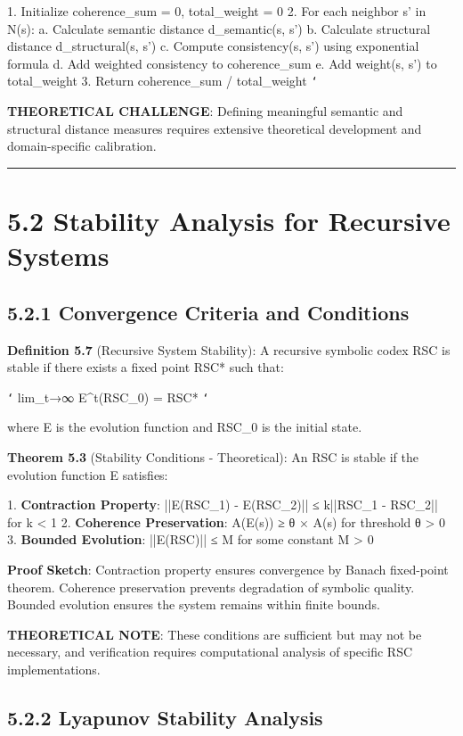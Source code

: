 1. Initialize coherence_sum = 0, total_weight = 0
2. For each neighbor s' in N(s):
   a. Calculate semantic distance d_semantic(s, s')
   b. Calculate structural distance d_structural(s, s')
   c. Compute consistency(s, s') using exponential formula
   d. Add weighted consistency to coherence_sum
   e. Add weight(s, s') to total_weight
3. Return coherence_sum / total_weight
\texttt{`}

\textbf{THEORETICAL CHALLENGE}: Defining meaningful semantic and structural distance measures requires extensive theoretical development and domain-specific calibration.

\hrule

\section{5.2 Stability Analysis for Recursive Systems}

\subsection{5.2.1 Convergence Criteria and Conditions}

\textbf{Definition 5.7} (Recursive System Stability): A recursive symbolic codex RSC is stable if there exists a fixed point RSC* such that:

\texttt{`}
lim_{t→∞} E^t(RSC_0) = RSC*
\texttt{`}

where E is the evolution function and RSC_0 is the initial state.

\textbf{Theorem 5.3} (Stability Conditions - Theoretical): An RSC is stable if the evolution function E satisfies:

1. \textbf{Contraction Property}: ||E(RSC_1) - E(RSC_2)|| ≤ k||RSC_1 - RSC_2|| for k < 1
2. \textbf{Coherence Preservation}: A(E(s)) ≥ θ × A(s) for threshold θ > 0
3. \textbf{Bounded Evolution}: ||E(RSC)|| ≤ M for some constant M > 0

\textbf{Proof Sketch}: Contraction property ensures convergence by Banach fixed-point theorem. Coherence preservation prevents degradation of symbolic quality. Bounded evolution ensures the system remains within finite bounds.

\textbf{THEORETICAL NOTE}: These conditions are sufficient but may not be necessary, and verification requires computational analysis of specific RSC implementations.

\subsection{5.2.2 Lyapunov Stability Analysis}

